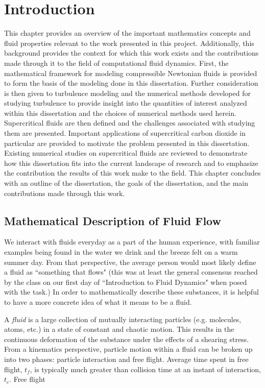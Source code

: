 \chapter{Introduction}
This chapter provides an overview of the important mathematics concepts and fluid properties relevant to the work presented in this project. Additionally, this background provides the context for which this work exists and the contributions made through it to the field of computational fluid dynamics. First, the mathematical framework for modeling compressible Newtonian fluids is provided to form the basis of the modeling done in this dissertation. Further consideration is then given to turbulence modeling and the numerical methods developed for studying turbulence to provide insight into the quantities of interest analyzed within this dissertation and the choices of numerical methods used herein. Supercritical fluids are then defined and the challenges associated with studying them are presented. Important applications of supercritical carbon dioxide in particular are provided to motivate the problem presented in this dissertation. Existing numerical studies on supercritical fluids are reviewed to demonstrate how this dissertation fits into the current landscape of research and to emphasize the contribution the results of this work make to the field. This chapter concludes with an outline of the dissertation, the goals of the dissertation, and the main contributions made through this work. 

\section{Mathematical Description of Fluid Flow}
We interact with fluids everyday as a part of the human experience, with familiar examples being found in the water we drink and the breeze felt on a warm summer day. From that perspective, the average person would most likely define a fluid as ``something that flows" (this was at least the general consensus reached by the class on our first day of ``Introduction to Fluid Dynamics" when posed with the task.) In order to mathematically describe these substances, it is helpful to have a more concrete idea of what it means to be a fluid. 

A \textit{fluid} is a large collection of mutually interacting particles (e.g. molecules, atoms, etc.) in a state of constant and chaotic motion. This results in the continuous deformation of the substance under the effects of a shearing stress. From a kinematics perspective, particle motion within a fluid can be broken up into two phases: particle interaction and free flight. Average time spent in free flight, $t_f$, is typically much greater than collision time at an instant of interaction, $t_c$. Free flight  

